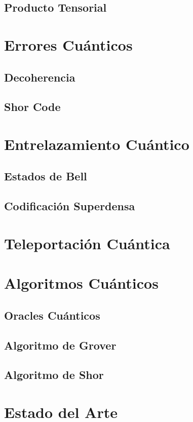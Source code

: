 \documentclass{article}
\numberwithin{equation}{section} %
\begin{document}
    \subsection{Producto Tensorial}
    \section{Errores Cuánticos}
    \subsection{Decoherencia}
    \subsection{Shor Code}
    \section{Entrelazamiento Cuántico}
    \subsection{Estados de Bell}
    \subsection{Codificación Superdensa}
    \section{Teleportación Cuántica}
    \section{Algoritmos Cuánticos}
    \subsection{Oracles Cuánticos}
    \subsection{Algoritmo de Grover}
    \subsection{Algoritmo de Shor}

    \section{Estado del Arte}
\end{document}
